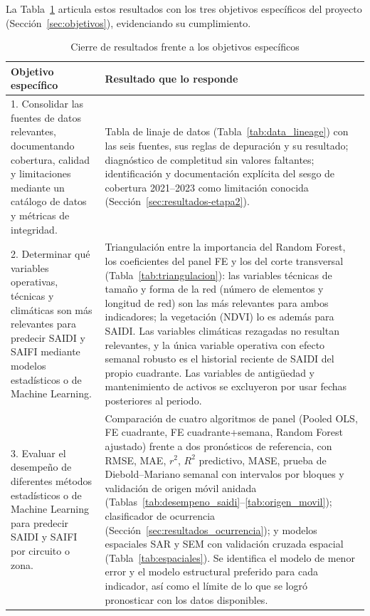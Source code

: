 La Tabla~\ref{tab:cierre_objetivos} articula estos resultados con los tres objetivos específicos del proyecto (Sección~\ref{sec:objetivos}), evidenciando su cumplimiento.

\begin{table}[!htbp]
\centering
\small
\caption{Cierre de resultados frente a los objetivos específicos}
\label{tab:cierre_objetivos}
\begin{tabular}{p{} p{}}
\toprule
\textbf{Objetivo específico} & \textbf{Resultado que lo responde} \\
\midrule
1. Consolidar las fuentes de datos relevantes, documentando cobertura, calidad y limitaciones mediante un catálogo de datos y métricas de integridad. &
Tabla de linaje de datos (Tabla~\ref{tab:data_lineage}) con las seis fuentes, sus reglas de depuración y su resultado; diagnóstico de completitud sin valores faltantes; identificación y documentación explícita del sesgo de cobertura 2021--2023 como limitación conocida (Sección~\ref{sec:resultados-etapa2}). \\
2. Determinar qué variables operativas, técnicas y climáticas son más relevantes para predecir SAIDI y SAIFI mediante modelos estadísticos o de Machine Learning. &
Triangulación entre la importancia del Random Forest, los coeficientes del panel FE y los del corte transversal (Tabla~\ref{tab:triangulacion}): las variables técnicas de tamaño y forma de la red (número de elementos y longitud de red) son las más relevantes para ambos indicadores; la vegetación (NDVI) lo es además para SAIDI. Las variables climáticas rezagadas no resultan relevantes, y la única variable operativa con efecto semanal robusto es el historial reciente de SAIDI del propio cuadrante. Las variables de antigüedad y mantenimiento de activos se excluyeron por usar fechas posteriores al periodo. \\
3. Evaluar el desempeño de diferentes métodos estadísticos o de Machine Learning para predecir SAIDI y SAIFI por circuito o zona. &
Comparación de cuatro algoritmos de panel (Pooled OLS, FE cuadrante, FE cuadrante+semana, Random Forest ajustado) frente a dos pronósticos de referencia, con RMSE, MAE, $r^2$, $R^2$ predictivo, MASE, prueba de Diebold--Mariano semanal con intervalos por bloques y validación de origen móvil anidada (Tablas~\ref{tab:desempeno_saidi}--\ref{tab:origen_movil}); clasificador de ocurrencia (Sección~\ref{sec:resultados_ocurrencia}); y modelos espaciales SAR y SEM con validación cruzada espacial (Tabla~\ref{tab:espaciales}). Se identifica el modelo de menor error y el modelo estructural preferido para cada indicador, así como el límite de lo que se logró pronosticar con los datos disponibles. \\
\bottomrule
\end{tabular}
\end{table}

